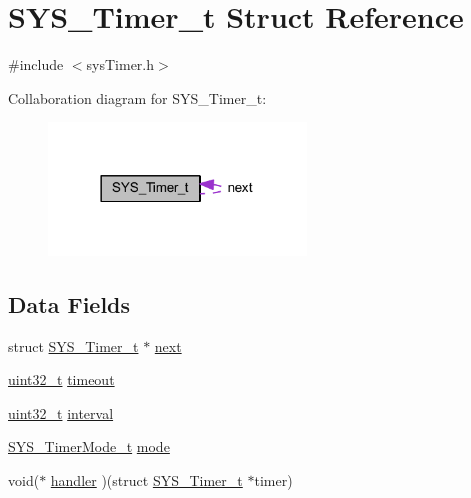 \hypertarget{struct_s_y_s___timer__t}{\section{S\-Y\-S\-\_\-\-Timer\-\_\-t Struct Reference}
\label{struct_s_y_s___timer__t}
}


{\ttfamily \#include $<$sys\-Timer.\-h$>$}



Collaboration diagram for S\-Y\-S\-\_\-\-Timer\-\_\-t\-:
\nopagebreak
\begin{figure}[H]
\begin{center}
\leavevmode
\includegraphics[width=194pt]{struct_s_y_s___timer__t__coll__graph}
\end{center}
\end{figure}
\subsection*{Data Fields}
\begin{DoxyCompactItemize}
\item 
struct \hyperlink{struct_s_y_s___timer__t}{S\-Y\-S\-\_\-\-Timer\-\_\-t} $\ast$ \hyperlink{struct_s_y_s___timer__t_af0da9cf144fe36ac5e1da4a528121820}{next}
\item 
\hyperlink{common_8h_a0ddb3f43e52282b59ee55d059ed74a28}{uint32\-\_\-t} \hyperlink{struct_s_y_s___timer__t_adf83122a4740de04c1029b1e0950ce94}{timeout}
\item 
\hyperlink{common_8h_a0ddb3f43e52282b59ee55d059ed74a28}{uint32\-\_\-t} \hyperlink{struct_s_y_s___timer__t_ac24aa7287900cd8b87e9f45bccd0b6ae}{interval}
\item 
\hyperlink{sys_timer_8h_ad3a3addd2cef39ce7fc9698efeb59cd5}{S\-Y\-S\-\_\-\-Timer\-Mode\-\_\-t} \hyperlink{struct_s_y_s___timer__t_ab992b241678bdcf98275a5de6ad81c5d}{mode}
\item 
void($\ast$ \hyperlink{struct_s_y_s___timer__t_a8d8270580165042de9b09efeb887173d}{handler} )(struct \hyperlink{struct_s_y_s___timer__t}{S\-Y\-S\-\_\-\-Timer\-\_\-t} $\ast$timer)
\end{DoxyCompactItemize}


